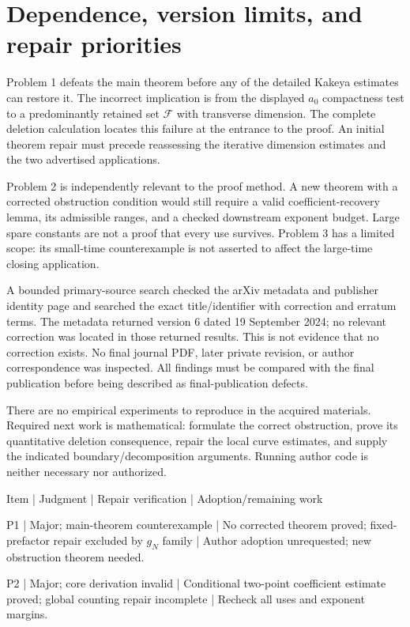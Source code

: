 \documentclass[10pt]{article}
\begin{document}
\section*{Dependence, version limits, and repair priorities}
Problem 1 defeats the main theorem before any of the detailed Kakeya estimates can restore it. The incorrect implication is from the displayed \(a_0\) compactness test to a predominantly retained set \(\mathcal F\) with transverse dimension. The complete deletion calculation locates this failure at the entrance to the proof. An initial theorem repair must precede reassessing the iterative dimension estimates and the two advertised applications.\par
Problem 2 is independently relevant to the proof method. A new theorem with a corrected obstruction condition would still require a valid coefficient-recovery lemma, its admissible ranges, and a checked downstream exponent budget. Large spare constants are not a proof that every use survives. Problem 3 has a limited scope: its small-time counterexample is not asserted to affect the large-time closing application.\par
A bounded primary-source search checked the arXiv metadata and publisher identity page and searched the exact title/identifier with correction and erratum terms. The metadata returned version 6 dated 19 September 2024; no relevant correction was located in those returned results. This is not evidence that no correction exists. No final journal PDF, later private revision, or author correspondence was inspected. All findings must be compared with the final publication before being described as final-publication defects.\par
There are no empirical experiments to reproduce in the acquired materials. Required next work is mathematical: formulate the correct obstruction, prove its quantitative deletion consequence, repair the local curve estimates, and supply the indicated boundary/decomposition arguments. Running author code is neither necessary nor authorized.\par
Item | Judgment | Repair verification | Adoption/remaining work\par
P1 | Major; main-theorem counterexample | No corrected theorem proved; fixed-prefactor repair excluded by \(g_N\) family | Author adoption unrequested; new obstruction theorem needed.\par
P2 | Major; core derivation invalid | Conditional two-point coefficient estimate proved; global counting repair incomplete | Recheck all uses and exponent margins.\par
\end{document}

